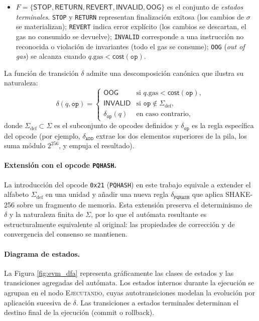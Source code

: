 \begin{definicion}
\begin{itemize}
  \item $F = \{\textsf{STOP}, \textsf{RETURN}, \textsf{REVERT}, \textsf{INVALID}, \textsf{OOG}\}$ es el conjunto de \emph{estados terminales}. \texttt{STOP} y \texttt{RETURN} representan finalización exitosa (los cambios de $\sigma$ se materializan); \texttt{REVERT} indica error explícito (los cambios se descartan, el gas no consumido se devuelve); \texttt{INVALID} corresponde a una instrucción no reconocida o violación de invariantes (todo el gas se consume); \texttt{OOG} (\emph{out of gas}) se alcanza cuando $q.\text{gas} < \textsf{cost}(\texttt{op})$.
\end{itemize}
\end{definicion}

La función de transición $\delta$ admite una descomposición canónica que ilustra su naturaleza:
\begin{equation}
  \delta(q, \texttt{op}) =
    \begin{cases}
      \textsf{OOG} & \text{si } q.\text{gas} < \textsf{cost}(\texttt{op}), \\
      \textsf{INVALID} & \text{si } \texttt{op} \notin \Sigma_{\text{def}}, \\
      \delta_{\texttt{op}}(q) & \text{en caso contrario},
    \end{cases}
  \label{eq:delta_evm}
\end{equation}
donde $\Sigma_{\text{def}} \subset \Sigma$ es el subconjunto de opcodes definidos y $\delta_{\texttt{op}}$ es la regla específica del opcode (por ejemplo, $\delta_{\texttt{ADD}}$ extrae los dos elementos superiores de la pila, los suma módulo $2^{256}$, y empuja el resultado).

\paragraph{Extensión con el opcode \texttt{PQHASH}.} La introducción del opcode \texttt{0x21} (\texttt{PQHASH}) en este trabajo equivale a extender el alfabeto $\Sigma_{\text{def}}$ en una unidad y añadir una nueva regla $\delta_{\texttt{PQHASH}}$ que aplica SHAKE-256 sobre un fragmento de memoria. Esta extensión preserva el determinismo de $\delta$ y la naturaleza finita de $\Sigma$, por lo que el autómata resultante es estructuralmente equivalente al original: las propiedades de corrección y de convergencia del consenso se mantienen.

\paragraph{Diagrama de estados.} La Figura \ref{fig:evm_dfa} representa gráficamente las clases de estados y las transiciones agregadas del autómata. Los estados internos durante la ejecución se agrupan en el nodo \textsc{Ejecutando}, cuyas autotransiciones modelan la evolución por aplicación sucesiva de $\delta$. Las transiciones a estados terminales determinan el destino final de la ejecución (commit o rollback).

